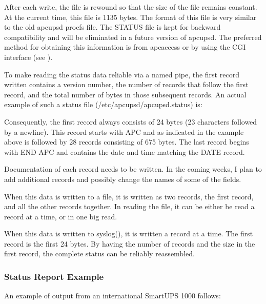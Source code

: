 {{{{{{{{{{{{{{{After each write, the file is rewound so that the size of the file remains
constant. At the current time, this file is 1135 bytes. The format of this
file is very similar to the old apcupsd procfs file. The STATUS file is kept
for backward compatibility and will be eliminated in a future version of
apcupsd. The preferred method for obtaining this information is from apcaccess
or by using the CGI interface (see 
).  

To make reading the status data reliable via a named pipe, the first record
written contains a version number, the number of records that follow the first
record, and the total number of bytes in those subsequent records. An actual
example of such a status file (/etc/apcupsd/apcupsd.status) is:  

Consequently, the first record always consists of 24 bytes (23 characters
followed by a newline). This record starts with APC and as indicated in the
example above is followed by 28 records consisting of 675 bytes. The last
record begins with END APC and contains the date and time matching the DATE
record.  

Documentation of each record needs to be written. In the coming weeks, I plan
to add additional records and possibly change the names of some of the fields.
 

When this data is written to a file, it is written as two records, the first
record, and all the other records together. In reading the file, it can be
either be read a record at a time, or in one big read.  

When this data is written to syslog(), it is written a record at a time. The
first record is the first 24 bytes. By having the number of records and the
size in the first record, the complete status can be reliably reassembled. 

\label{Status-Report-Example}

\subsubsection*{Status Report Example}

\label{index-Examples_002c-Status-Report-254}
\label{index-Status-255}
An example of output from an international SmartUPS 1000 follows: 

\footnotesize
\begin{verbatim}
     

\end{verbatim}}}}}}}}}}}}}}}}

